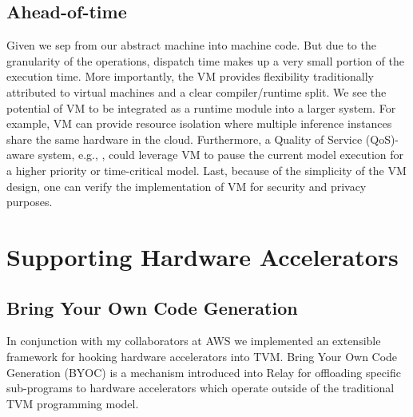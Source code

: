 
\subsection{Ahead-of-time}

Given we sep from our abstract machine into machine code.
But due to the granularity of the operations, dispatch time makes
  up a very small portion of the execution time.
More importantly, the VM provides flexibility traditionally attributed
  to virtual machines and a clear compiler/runtime split.
We see the potential of VM to be integrated as a runtime module into a larger system.
For example, VM can provide resource isolation where multiple inference
  instances share the same hardware in the cloud.
Furthermore, a Quality of Service (QoS)-aware system, e.g., \citep{kang2018hotmobile, Yachir2009rsj},
  could leverage VM to pause the current model execution for a higher priority or time-critical model.
Last, because of the simplicity of the VM design, one can verify the implementation of VM for security and privacy purposes.


\section{Supporting Hardware Accelerators}
\label{sec:accel}

\subsection{Bring Your Own Code Generation}

In conjunction with my collaborators at AWS we implemented an
  extensible framework for hooking hardware accelerators into
  TVM.
Bring Your Own Code Generation (BYOC) is a mechanism introduced
  into Relay for offloading specific sub-programs to hardware
  accelerators which operate outside of the traditional TVM
  programming model.


